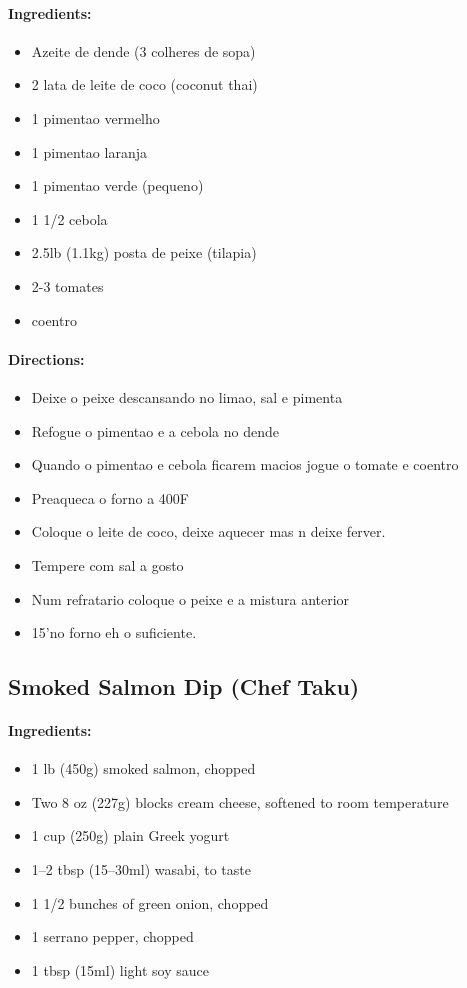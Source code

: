 \documentclass{article}
\begin{document}
\paragraph{Ingredients:}
\begin{itemize}
    \item Azeite de dende (3 colheres de sopa)
    \item 2 lata de leite de coco (coconut thai)
    \item 1 pimentao vermelho
    \item 1 pimentao laranja
    \item 1 pimentao verde (pequeno)
    \item 1 1/2 cebola
    \item 2.5lb (1.1kg) posta de peixe (tilapia)
    \item 2-3 tomates
    \item coentro
\end{itemize}

\paragraph{Directions:}
\begin{itemize}
    \item Deixe o peixe descansando no limao, sal e pimenta
    \item Refogue o pimentao e a cebola no dende
    \item Quando o pimentao e cebola ficarem macios jogue o tomate e coentro
    \item Preaqueca o forno a 400F
    \item Coloque o leite de coco, deixe aquecer mas n deixe ferver.
    \item Tempere com sal a gosto
    \item Num refratario coloque o peixe e a mistura anterior
    \item 15'no forno eh o suficiente.
\end{itemize}

\subsection{Smoked Salmon Dip (Chef Taku)}

\paragraph{Ingredients:}
\begin{itemize}
    \item 1 lb (450g) smoked salmon, chopped
    \item Two 8 oz (227g) blocks cream cheese, softened to room temperature
    \item 1 cup (250g) plain Greek yogurt
    \item 1–2 tbsp (15–30ml) wasabi, to taste
    \item 1 1/2 bunches of green onion, chopped
    \item 1 serrano pepper, chopped
    \item 1 tbsp (15ml) light soy sauce
\end{itemize}
\end{document}
